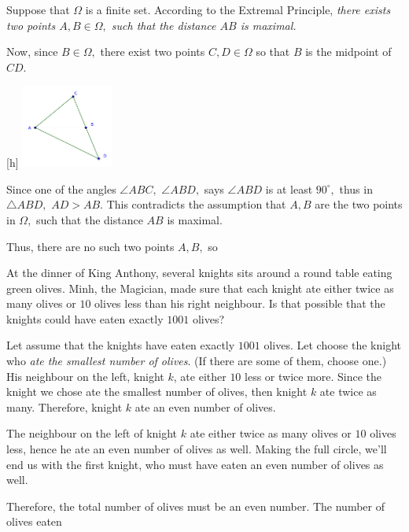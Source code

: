 \documentclass{article}
\begin{document}
\begin{soln}
    Suppose that $\Omega$ is a finite set.
    According to the Extremal Principle,
    \textit{there exists two points $A, B \in \Omega,$ such that the distance $AB$ is maximal.}

    Now, since $B \in \Omega,$ there exist two points $C,D \in \Omega$ so that $B$ is the midpoint of $CD.$
    \begin{center}[h]
        \includegraphics[width=3cm]{./svg/pdf/2022-2-ms-1-3.pdf}
    \end{center}        

    Since one of the angles $\angle ABC,$ $\angle ABD,$ says $\angle ABD$ is at least $90^{\circ},$
    thus in $\triangle ABD,$ $AD > AB.$
    This contradicts the assumption that $A, B$ are the two points in $\Omega,$ such that the distance $AB$ is maximal.

    Thus, there are no such two points $A, B,$ so 
\end{soln}

\newpage

\begin{example*}

    At the dinner of King Anthony, several knights sits around a round table eating green olives.
    Minh, the Magician, made sure that each knight ate either twice as many olives
    or $10$ olives less than his right neighbour. 
    Is that possible that the knights could have eaten exactly $1001$ olives?
\end{example*}

\begin{soln}
    Let assume that the knights have eaten exactly $1001$ olives.
    Let choose the knight who \textit{ate the smallest number of olives}.
    (If there are some of them, choose one.)
    His neighbour on the left, knight $k$, ate either $10$ less or twice more.
    Since the knight we chose ate the smallest number of olives, then knight $k$ ate twice as many.
    Therefore, knight $k$ ate an even number of olives. 

    The neighbour on the left of knight $k$ ate either twice as many olives or $10$ olives less,
    hence he ate an even number of olives as well. Making the full circle, we'll end us with the first knight,
    who must have eaten an even number of olives as well.
    
    Therefore, the total number of olives must be an even number.
    The number of olives eaten 
\end{soln}
\end{document}
